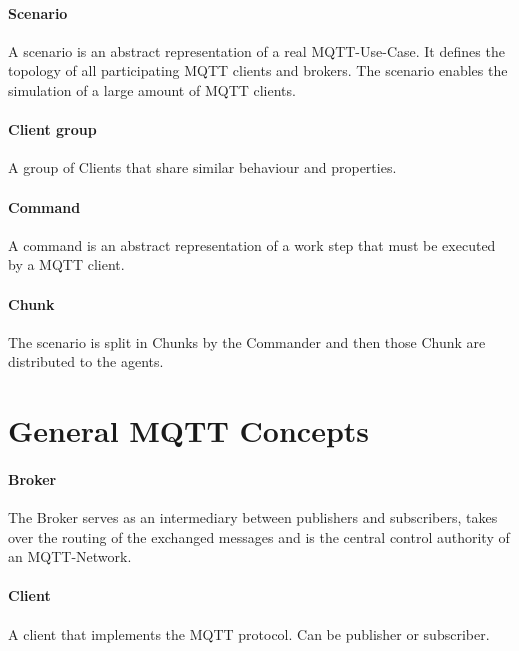 \paragraph{Scenario}
A scenario is an abstract representation of a real MQTT-Use-Case.
It defines the topology of all participating MQTT clients and brokers.
The scenario enables the simulation of a large amount of MQTT clients.

\paragraph{Client group}
A group of Clients that share similar behaviour and properties.

\paragraph{Command}
A command is an abstract representation of a work step that must be executed by a MQTT client.

\paragraph{Chunk}
The scenario is split in Chunks by the Commander and then those Chunk are distributed to the agents.


\section{General MQTT Concepts}
\paragraph{Broker}
The Broker serves as an intermediary between publishers and subscribers, takes over the routing of the exchanged messages and is the central
control authority of an MQTT-Network.
\paragraph{Client}
A client that implements the MQTT protocol. 
Can be publisher or subscriber.
